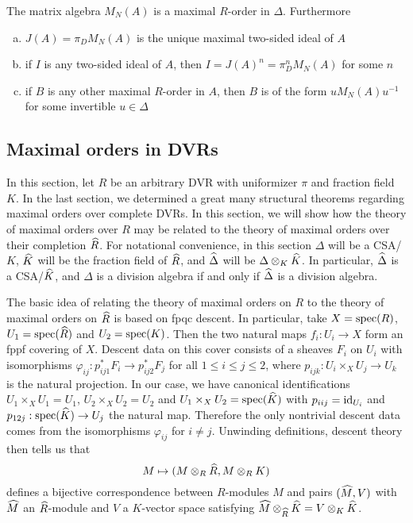 \begin{thm}
The matrix algebra $M_N(A)$ is a maximal $R$-order in $\Delta$.  Furthermore
\begin{enumerate}[(a)]
\item  $J(A) = \pi_DM_N(A)$ is the unique maximal two-sided ideal of $A$
\item  if $I$ is any two-sided ideal of $A$, then $I = J(A)^n = \pi_D^n M_N(A)$ for some $n$
\item  if $B$ is any other maximal $R$-order in $A$, then $B$ is of the form $u M_N(A) u^{-1}$ for some invertible $u\in\Delta$
\end{enumerate}
\end{thm}

\subsection{Maximal orders in DVRs}
In this section, let $R$ be an arbitrary DVR with uniformizer $\pi$ and fraction field $K$.  In the last section, we determined a great many structural theorems regarding maximal orders over complete DVRs.  In this section, we will show how the theory of maximal orders over $R$ may be related to the theory of maximal orders over their completion $\widehat R$.  For notational convenience, in this section $\Delta$ will be a CSA/$K$, $\widehat K$ will be the fraction field of $\widehat R$, and $\widehat\Delta$ will be $\Delta\otimes_K \widehat K$.  In particular, $\widehat \Delta$ is a CSA/$\widehat K$, and $\Delta$ is a division algebra if and only if $\widehat \Delta$ is a division algebra.

The basic idea of relating the theory of maximal orders on $R$ to the theory of maximal orders on $\widehat R$ is based on fpqc descent.  In particular, take $X = \textnormal{spec}(R)$, $U_1 = \textnormal{spec}(\widehat R)$ and $U_2 = \textnormal{spec}(K)$.  Then the two natural maps $f_i: U_i\rightarrow X$ form an fppf covering of $X$.  Descent data on this cover consists of a sheaves $F_i$ on $U_i$ with isomorphisms $\varphi_{ij}: p_{ij1}^*F_i\rightarrow p_{ij2}^*F_j$ for all $1\leq i\leq j\leq 2$, where $p_{ijk}:U_i\times_X U_j\rightarrow U_k$ is the natural projection.  In our case, we have canonical identifications $U_1\times_X U_1 = U_1$, $U_2\times_X U_2 = U_2$ and $U_1\times_X U_2 = \textnormal{spec}(\widehat K)$ with $p_{iij} = \textnormal{id}_{U_i}$ and $p_{12j}:\textnormal{spec}(\widehat K)\rightarrow U_j$ the natural map.  Therefore the only nontrivial descent data comes from the isomorphisms $\varphi_{ij}$ for $i\neq j$.  Unwinding definitions, descent theory then tells us that
$$M\mapsto (M\otimes_R\widehat{R},M\otimes_R K)$$
defines a bijective correspondence between $R$-modules $M$ and pairs $(\widehat M, V)$ with $\widehat M$ an $\widehat R$-module and $V$ a $K$-vector space satisfying $\widehat M\otimes_{\widehat R} \widehat K = V\otimes_K \widehat K$.

